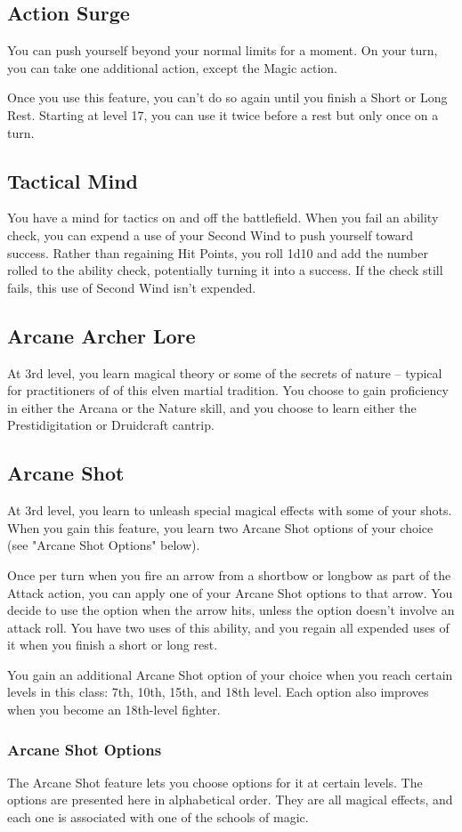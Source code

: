 \documentclass[letterpaper,openany,oneside,twocolumn]{book}
\begin{document}
\subsection*{Action Surge}
You can push yourself beyond your normal limits for a moment. On your turn, you can take one additional action, except the Magic action.

Once you use this feature, you can't do so again until you finish a Short or Long Rest. Starting at level 17, you can use it twice before a rest but only once on a turn.
\subsection*{Tactical Mind}
You have a mind for tactics on and off the battlefield. When you fail an ability check, you can expend a use of your Second Wind to push yourself toward success. Rather than regaining Hit Points, you roll 1d10 and add the number rolled to the ability check, potentially turning it into a success. If the check still fails, this use of Second Wind isn't expended.
\subsection*{Arcane Archer Lore}
At 3rd level, you learn magical theory or some of the secrets of nature – typical for practitioners of of this elven martial tradition. You choose to gain proficiency in either the Arcana or the Nature skill, and you choose to learn either the Prestidigitation or Druidcraft cantrip.
\subsection*{Arcane Shot}
At 3rd level, you learn to unleash special magical effects with some of your shots. When you gain this feature, you learn two Arcane Shot options of your choice (see "Arcane Shot Options" below).

Once per turn when you fire an arrow from a shortbow or longbow as part of the Attack action, you can apply one of your Arcane Shot options to that arrow. You decide to use the option when the arrow hits, unless the option doesn’t involve an attack roll. You have two uses of this ability, and you regain all expended uses of it when you finish a short or long rest.

You gain an additional Arcane Shot option of your choice when you reach certain levels in this class: 7th, 10th, 15th, and 18th level. Each option also improves when you become an 18th-level fighter.
\subsubsection*{Arcane Shot Options}
The Arcane Shot feature lets you choose options for it at certain levels. The options are presented here in alphabetical order. They are all magical effects, and each one is associated with one of the schools of magic.
\end{document}

